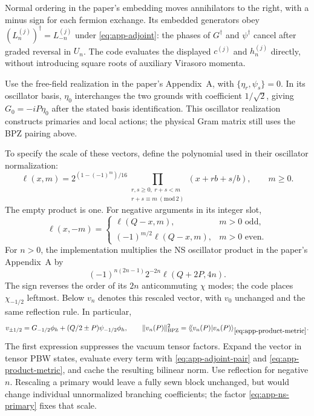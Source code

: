 Normal ordering in the paper's embedding moves annihilators to the
right, with a minus sign for each fermion exchange. Its embedded
generators obey $(L_n^{(j)})^\dagger=L_{-n}^{(j)}$ under
\eqref{eq:app-adjoint}: the phases of $G^\dagger$ and
$\psi^\dagger$ cancel after graded reversal in $U_n$.
The code evaluates the displayed
$c^{(j)}$ and $h_n^{(j)}$ directly, without introducing square roots
of auxiliary Virasoro momenta.

Use the free-field realization in the paper's Appendix~A, with
$\{\eta_r,\psi_s\}=0$. In its oscillator basis,
$\eta_0$ interchanges the two grounds with coefficient $1/\sqrt2$,
giving $G_0=-iP\eta_0$ after the stated basis identification.
This oscillator realization constructs primaries and local actions;
the physical Gram matrix still uses the BPZ pairing above.

To specify the scale of these vectors, define the polynomial used
in their oscillator normalization:
\begin{equation}
 \ell(x,m)=2^{(1-(-1)^m)/16}
 \prod_{\substack{r,s\ge0,\ r+s<m\\r+s\equiv m\ (\mathrm{mod}\,2)}}
 (x+rb+s/b),\qquad m\ge0.
 \label{eq:app-ell}
\end{equation}
The empty product is one. For negative arguments in its integer slot,
\begin{equation}
 \ell(x,-m)=
 \begin{cases}
 \ell(Q-x,m),&m>0\text{ odd},\\
 (-1)^{m/2}\ell(Q-x,m),&m>0\text{ even}.
 \end{cases}
 \label{eq:app-ell-negative}
\end{equation}
For $n>0$, the implementation multiplies the NS oscillator product
in the paper's Appendix~A by
\begin{equation}
 (-1)^{n(2n-1)}2^{-2n}\ell(Q+2P,4n).
 \label{eq:app-ns-primary}
\end{equation}
The sign reverses the order of its $2n$ anticommuting $\chi$ modes;
the code places $\chi_{-1/2}$ leftmost. Below $v_n$ denotes this
rescaled vector, with $v_0$ unchanged and the same reflection rule.
In particular,
\begin{equation}
 v_{\pm1/2}=G_{-1/2}\phi_h+(Q/2\pm P)\psi_{-1/2}\phi_h,
 \qquad
 \|v_n(P)\|_{\rm BPZ}^2
 =\langle\!\langle v_n(P)|v_n(P)\rangle_{\eqref{eq:app-product-metric}}.
 \label{eq:app-ns-norm}
\end{equation}
The first expression suppresses the vacuum tensor factors. Expand
the vector in tensor PBW states, evaluate every term with
\eqref{eq:app-adjoint-pair} and \eqref{eq:app-product-metric}, and
cache the resulting bilinear norm. Use reflection for negative $n$.
Rescaling a primary would leave a fully
sewn block unchanged, but would change individual unnormalized
branching coefficients; the factor \eqref{eq:app-ns-primary} fixes
that scale.

